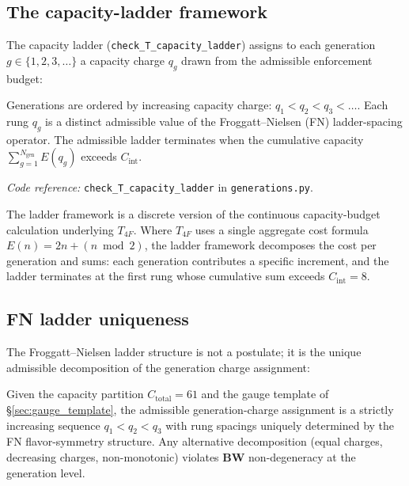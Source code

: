 \documentclass[11pt]{article}
\newcommand{\coderef}[2]{\smallskip\noindent\textit{Code reference:} \texttt{#1} in \texttt{#2}.}
\newcommand{\epitag}[1]{\textbf{[#1]}}
\newcommand{\BW}{\textbf{BW}}
\theoremstyle{definition}
\begin{document}
\subsection{The capacity-ladder framework}\label{sec:ladder_framework}

The capacity ladder (\texttt{check\_T\_capacity\_ladder}) assigns to each generation $g \in \{1, 2, 3, \ldots\}$ a capacity charge $q_g$ drawn from the admissible enforcement budget:

\begin{tcolorbox}[apfbox, title={$T_{\mathrm{capacity\_ladder}}$ \epitag{P}}]
Generations are ordered by increasing capacity charge: $q_1 < q_2 < q_3 < \ldots$. Each rung $q_g$ is a distinct admissible value of the Froggatt--Nielsen (FN) ladder-spacing operator. The admissible ladder terminates when the cumulative capacity $\sum_{g=1}^{N_{\mathrm{gen}}} E(q_g)$ exceeds $C_{\mathrm{int}}$.
\end{tcolorbox}

\coderef{check\_T\_capacity\_ladder}{generations.py}

The ladder framework is a discrete version of the continuous capacity-budget calculation underlying $T_{4F}$. Where $T_{4F}$ uses a single aggregate cost formula $E(n) = 2n + (n \bmod 2)$, the ladder framework decomposes the cost per generation and sums: each generation contributes a specific increment, and the ladder terminates at the first rung whose cumulative sum exceeds $C_{\mathrm{int}} = 8$.

\subsection{FN ladder uniqueness}\label{sec:generation_cost_formula}

The Froggatt--Nielsen ladder structure is not a postulate; it is the unique admissible decomposition of the generation charge assignment:

\begin{tcolorbox}[apfbox, title={$L_{\mathrm{FN\_ladder\_uniqueness}}$ \epitag{P\_structural}}]
Given the capacity partition $C_{\mathrm{total}} = 61$ and the gauge template of \S\ref{sec:gauge_template}, the admissible generation-charge assignment is a strictly increasing sequence $q_1 < q_2 < q_3$ with rung spacings uniquely determined by the FN flavor-symmetry structure. Any alternative decomposition (equal charges, decreasing charges, non-monotonic) violates \BW{} non-degeneracy at the generation level.
\end{tcolorbox}
\end{document}
